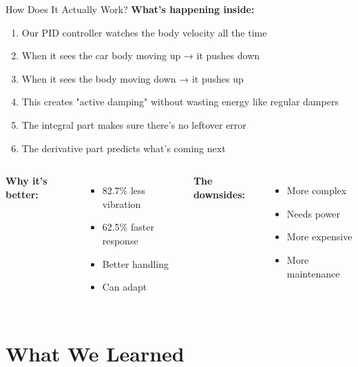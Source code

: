 \documentclass[aspectratio=169]{beamer}
\begin{document}
\begin{frame}{How Does It Actually Work?}
  \textbf{What's happening inside:}
  
  \begin{enumerate}
    \item Our PID controller watches the body velocity all the time
    \item When it sees the car body moving up → it pushes down
    \item When it sees the body moving down → it pushes up
    \item This creates "active damping" without wasting energy like regular dampers
    \item The integral part makes sure there's no leftover error
    \item The derivative part predicts what's coming next
  \end{enumerate}
  
  \vspace{0.4cm}
  
  \begin{columns}
    \textbf{Why it's better:}
    \begin{itemize}
      \item 82.7\% less vibration
      \item 62.5\% faster response
      \item Better handling
      \item Can adapt
    \end{itemize}
    
    \textbf{The downsides:}
    \begin{itemize}
      \item More complex
      \item Needs power
      \item More expensive
      \item More maintenance
    \end{itemize}
  \end{columns}
\end{frame}

\section{What We Learned}
\end{document}
